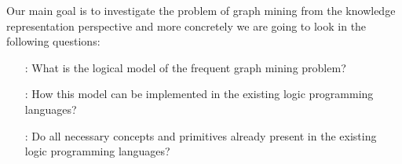 






Our main goal is to investigate the problem of graph mining from the knowledge representation perspective and more concretely we are going to look in the following questions:
\begin{itemize}
  \item[\Qone:]   What is the logical model of the frequent graph mining problem?
  \item[\Qtwo:]   How this model can be implemented in the existing logic programming languages?
  \item[\Qthree:] Do all necessary concepts and primitives already present in the existing logic programming languages?
\end{itemize}



